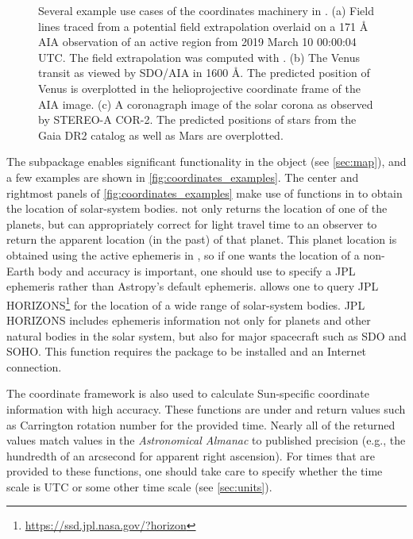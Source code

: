 \begin{figure}
    \caption{Several example use cases of the coordinates machinery in \sunpy.
    (a) Field lines traced from a potential field extrapolation overlaid on a 171 \AA{} AIA observation of an active region from 2019 March 10 00:00:04 UTC.
    The field extrapolation was computed with  \citep{david_stansby_2019_3237053}.
    (b) The Venus transit as viewed by SDO/AIA in 1600 \AA. The predicted position of Venus is overplotted in the helioprojective coordinate frame of the AIA image.
    (c) A coronagraph image of the solar corona as observed by STEREO-A COR-2. The predicted positions of stars from the Gaia DR2 catalog as well as Mars are overplotted.}
    \label{fig:coordinates_examples}
\end{figure}

The  subpackage enables significant functionality in the  object (see \autoref{sec:map}), and a few examples are shown in \autoref{fig:coordinates_examples}.
The center and rightmost panels of \autoref{fig:coordinates_examples} make use of functions in  to obtain the location of solar-system bodies.
 not only returns the location of one of the planets, but can appropriately correct for light travel time to an observer to return the apparent location (in the past) of that planet.
This planet location is obtained using the active ephemeris in , so if one wants the location of a non-Earth body and accuracy is important, one should use  to specify a JPL ephemeris rather than Astropy's default ephemeris.
 allows one to query JPL HORIZONS\footnote{\url{https://ssd.jpl.nasa.gov/?horizon}} for the location of a wide range of solar-system bodies.
JPL HORIZONS includes ephemeris information not only for planets and other natural bodies in the solar system, but also for major spacecraft such as SDO and SOHO.
This function requires the  package \citep{ginsburg_astroquery_2019} to be installed and an Internet connection.

The coordinate framework is also used to calculate Sun-specific coordinate information with high accuracy.
These functions are under  and return values such as Carrington rotation number for the provided time.
Nearly all of the returned values match values in the \textit{Astronomical Almanac} to published precision (e.g., the hundredth of an arcsecond for apparent right ascension).
For times that are provided to these functions, one should take care to specify whether the time scale is UTC or some other time scale (see \autoref{sec:units}).

